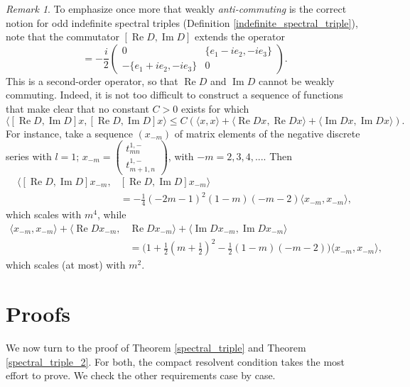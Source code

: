 \documentclass{amsart}
\theoremstyle{definition}
\theoremstyle{remark}
\newtheorem{remark}[theorem]{Remark}
\DeclareMathOperator{\Ree}{Re}
\DeclareMathOperator{\Imm}{Im}
\numberwithin{equation}{section}
\begin{document}
\begin{remark}
    To emphasize once more that weakly \emph{anti-commuting} is the correct notion for odd indefinite spectral triples (Definition \ref{indefinite_spectral_triple}), note that the commutator $[\Ree D,\Imm D]$ extends the operator
    \begin{equation*}
        [\tfrac{1}{2}(D_0+E_0),-\tfrac{i}{2}(D_0-E_0)]=-\frac{i}{2}\begin{pmatrix}
            0 & \{e_1-ie_2,-ie_3\}\\
            -\{e_1+ie_2,-ie_3\} & 0
        \end{pmatrix}.
    \end{equation*}
    This is a second-order operator, so that $\Ree D$ and $\Imm D$ cannot be weakly commuting. Indeed, it is not too difficult to construct a sequence of functions that make clear that no constant $C>0$ exists for which
    \begin{equation*}
        \langle [\Ree D,\Imm D]x,[\Ree D,\Imm D]x\rangle\leq C(\langle x,x\rangle+\langle \Ree Dx,\Ree Dx\rangle+\langle \Imm Dx,\Imm Dx\rangle).
    \end{equation*}
    For instance, take a sequence $(x_{-m})$ of matrix elements of the negative discrete series with $l=1$; $x_{-m}=\begin{pmatrix}
        t^{1,-}_{mn} \\ t^{1,-}_{m+1,n}
    \end{pmatrix}$, with $-m=2,3,4,...$. Then
    \begin{align*}
        \langle [\Ree D,\Imm D]x_{-m},&[\Ree D,\Imm D]x_{-m}\rangle\\
        &=-\frac{1}{4}(-2m-1)^2(1-m)(-m-2)\langle x_{-m},x_{-m}\rangle,
    \end{align*}
    which scales with $m^4$, while
    \begin{align*}
        \langle x_{-m},x_{-m}\rangle+\langle\Ree D x_{-m},&\Ree D x_{-m}\rangle+\langle\Imm D x_{-m},\Imm D x_{-m}\rangle\\
        &=\big(1+\tfrac{1}{2}(m+\tfrac{1}{2})^2-\tfrac{1}{2}(1-m)(-m-2)\big)\langle x_{-m},x_{-m}\rangle,
    \end{align*}
    which scales (at most) with $m^2$.
\end{remark}
    
\section{Proofs}\label{sec_proof}
We now turn to the proof of Theorem \ref{spectral_triple} and Theorem \ref{spectral_triple_2}. For both, the compact resolvent condition takes the most effort to prove. We check the other requirements case by case.
\end{document}
